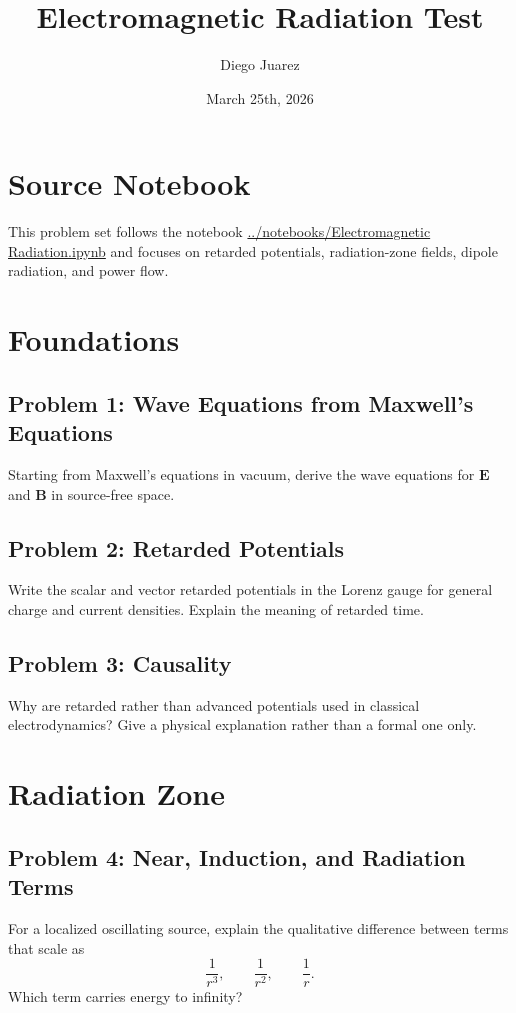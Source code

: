 \documentclass[hidelinks]{article}
\title{\textbf{Electromagnetic Radiation Test}}
\author{Diego Juarez}
\date{March 25th, 2026}
\begin{document}
\hypersetup{bookmarksnumbered=true}
\pagecolor{black}
\color{white}
\maketitle

\begin{Large}
\tableofcontents
\end{Large}
\pagebreak

\section{Source Notebook}
This problem set follows the notebook
\url{../notebooks/Electromagnetic Radiation.ipynb}
and focuses on retarded potentials, radiation-zone fields, dipole radiation, and power flow.

\section{Foundations}
\subsection{Problem 1: Wave Equations from Maxwell's Equations}
Starting from Maxwell's equations in vacuum, derive the wave equations for $\mathbf{E}$ and $\mathbf{B}$ in source-free space.

\subsection{Problem 2: Retarded Potentials}
Write the scalar and vector retarded potentials in the Lorenz gauge for general charge and current densities. Explain the meaning of retarded time.

\subsection{Problem 3: Causality}
Why are retarded rather than advanced potentials used in classical electrodynamics? Give a physical explanation rather than a formal one only.

\section{Radiation Zone}
\subsection{Problem 4: Near, Induction, and Radiation Terms}
For a localized oscillating source, explain the qualitative difference between terms that scale as
\[
\frac{1}{r^3},\qquad \frac{1}{r^2},\qquad \frac{1}{r}.
\]
Which term carries energy to infinity?
\end{document}
